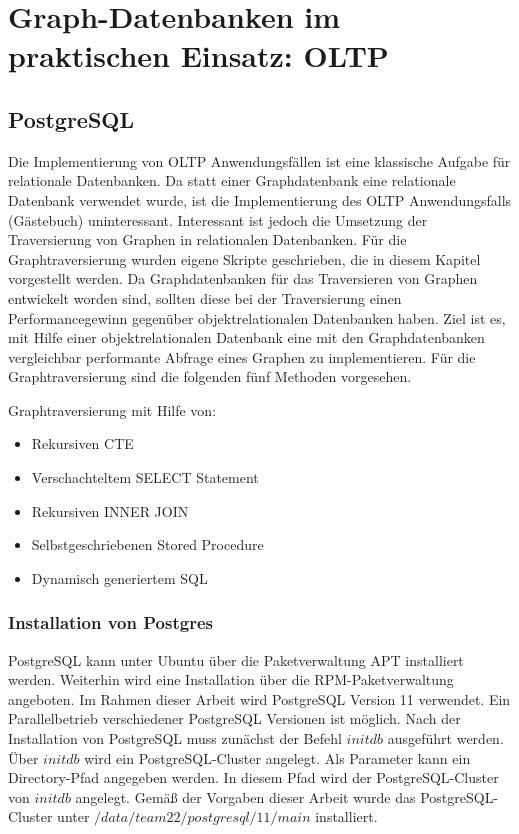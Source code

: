 \chapter{Graph-Datenbanken im praktischen Einsatz: \ac{OLTP}}
\section{PostgreSQL}
Die Implementierung von OLTP Anwendungsfällen ist eine klassische Aufgabe für relationale Datenbanken.
Da statt einer Graphdatenbank eine relationale Datenbank verwendet wurde, ist die Implementierung des OLTP Anwendungsfalls (Gästebuch) uninteressant.
Interessant ist jedoch die Umsetzung der Traversierung von Graphen in relationalen Datenbanken.
Für die Graphtraversierung wurden eigene Skripte geschrieben, die in diesem Kapitel vorgestellt werden.
Da Graphdatenbanken für das Traversieren von Graphen entwickelt worden sind, sollten diese bei der Traversierung einen Performancegewinn gegenüber objektrelationalen Datenbanken haben.
Ziel ist es, mit Hilfe einer objektrelationalen Datenbank eine mit den Graphdatenbanken vergleichbar performante Abfrage eines Graphen zu implementieren.
Für die Graphtraversierung sind die folgenden fünf Methoden vorgesehen.

Graphtraversierung mit Hilfe von:
\begin{itemize}
    \item Rekursiven \ac{CTE}
    \item Verschachteltem SELECT Statement
    \item Rekursiven INNER JOIN
    \item Selbstgeschriebenen Stored Procedure
    \item Dynamisch generiertem \ac{SQL}
\end{itemize}
\subsection{Installation von Postgres}
PostgreSQL kann unter Ubuntu über die Paketverwaltung \ac{APT} installiert werden.
Weiterhin wird eine Installation über die \ac{RPM}-Paketverwaltung angeboten.
Im Rahmen dieser Arbeit wird PostgreSQL Version 11 verwendet.
Ein Parallelbetrieb verschiedener PostgreSQL Versionen ist möglich.
Nach der Installation von PostgreSQL muss zunächst der Befehl $initdb$ ausgeführt werden.
Über $initdb$ wird ein PostgreSQL-Cluster angelegt.
Als Parameter kann ein Directory-Pfad angegeben werden.
In diesem Pfad wird der PostgreSQL-Cluster von $initdb$ angelegt.
Gemäß der Vorgaben dieser Arbeit wurde das PostgreSQL-Cluster unter $/data/team22/postgresql/11/main$ installiert.
